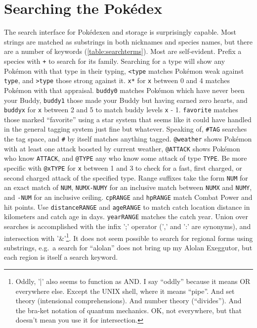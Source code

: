 \section{Searching the Pokédex\label{sec:searching}}
The search interface for Pokédexen and storage is surprisingly capable.
Most strings are matched as substrings in both nicknames and species names,
 but there are a number of keywords (\autoref{table:searchterms}).
Most are self-evident.
Prefix a species with \texttt{+} to search for its family.
Searching for a type will show any Pokémon with that type in their typing,
 \texttt{<type} matches Pokémon weak against \texttt{type},
 and \texttt{>type} those strong against it.
\texttt{x*} for \texttt{x} between 0 and 4 matches Pokémon with that appraisal.
\texttt{buddy0} matches Pokémon which have never been your Buddy,
 \texttt{buddy1} those made your Buddy but having earned zero hearts,
 and \texttt{buddyx} for \texttt{x} between 2 and 5 to match buddy
 levels \texttt{x} - 1.
\texttt{favorite} matches those marked ``favorite'' using a star system that
 seems like it could have handled in the general tagging system just fine
 but whatever.
Speaking of, \texttt{\#TAG} searches the tag space, and \texttt{\#} by itself
 matches anything tagged.
\texttt{@weather} shows Pokémon with at least one attack boosted by current
 weather, \texttt{@ATTACK} shows Pokémon who know \texttt{ATTACK}, and \texttt{@TYPE}
 any who know some attack of type \texttt{TYPE}.
Be more specific with \texttt{@xTYPE} for \texttt{x} between 1 and 3 to check
  for a fast, first charged, or second charged attack of the specified type.
Range suffixes take the form \texttt{NUM} for an exact match of \texttt{NUM},
  \texttt{NUMX-NUMY} for an inclusive match between \texttt{NUMX} and \texttt{NUMY},
  and \texttt{-NUM} for an inclusive ceiling.
\texttt{cpRANGE} and \texttt{hpRANGE} match Combat Power and hit points.
Use \texttt{distanceRANGE} and \texttt{ageRANGE} to match catch location
  distance in kilometers and catch age in days.
\texttt{yearRANGE} matches the catch year.
Union over searches is accomplished with the infix ';' operator (',' and ':' are synonyms),
  and intersection with '\&'\footnote{Oddly, '|' also seems to function as AND. I say ``oddly'' because it means OR everywhere else.
  Except the UNIX shell, where it means ``pipe''.
  And set theory (intensional comprehensions).
  And number theory (``divides'').
  And the bra-ket notation of quantum mechanics.
  OK, not everywhere, but that doesn't mean you use it for intersection.}.
It does not seem possible to search for regional forms using substrings,
 e.g.\ a search for ``alolan'' does not bring up my Alolan Exeggutor,
 but each region is itself a search keyword.

